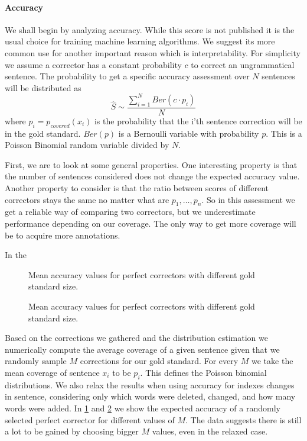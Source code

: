 \documentclass[english]{article}
\begin{document}
\paragraph{Accuracy} We shall begin by analyzing accuracy. While this score is not published it is the usual choice for training machine learning algorithms. We suggest its more common use for another important reason which is interpretability.
For simplicity we assume a corrector has a constant probability $c$ to correct an ungrammatical sentence. The probability to get a specific accuracy assessment over $N$ sentences will be distributed as $$\hat{S}\sim\frac{\sum_{i=1}^{N}Ber\left(c\cdot p_i\right)}{N} $$ 
where $p_i=p_{covered}\left(x_i\right) $ is the probability that the i'th sentence correction will be in the gold standard. 
$Ber\left(p\right)$ is a Bernoulli variable with probability $p$. This is a Poisson Binomial random variable divided by $N$. 

First, we are to look at some general properties.
 One interesting property is that the number of sentences considered does not change the expected accuracy value.
 Another property to consider is that the ratio between scores of different correctors stays the same no matter what are $p_1,\ldots,p_n$. So in this assessment we get a reliable way of comparing two correctors, but we underestimate performance depending on our coverage. The only way to get more coverage will be to acquire more annotations.
 
 In the
 
 \begin{figure}
 	\caption{Mean accuracy values for perfect correctors with different gold standard size.}
 	\label{fig:accuracy_vals}
 \end{figure}
  \begin{figure}
  	\caption{Mean accuracy values for perfect correctors with different gold standard size.}
  	\label{fig:accuracy_vals_ind}
  \end{figure}
 
 Based on the corrections we gathered and the distribution estimation we numerically compute the average coverage of a given sentence given that we randomly sample $M$ corrections for our gold standard. For every $M$ we take the mean coverage of sentence $x_i$ to be $p_i$. This defines the Poisson binomial distributions. We also relax the results when using accuracy for indexes changes in sentence, considering only which words were deleted, changed, and how many words were added. In \ref{fig:accuracy_vals} and \ref{fig:accuracy_vals_ind} we show the expected accuracy of a randomly selected perfect corrector for different values of $M$. The data suggests there is still a lot to be gained by choosing bigger $M$ values, even in the relaxed case.
 
\end{document}
